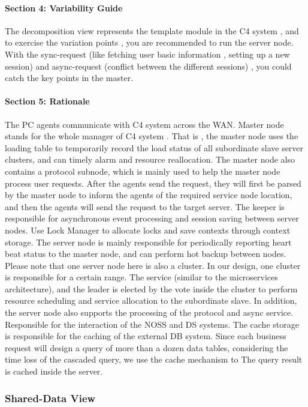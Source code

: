 \documentclass{article}
\begin{document}
			\paragraph{Section 4: Variability Guide}
			The decomposition view represents the template module in the C4 system , and to exercise the variation points , you are recommended to run the server node. With the sync-request (like fetching user basic information , setting up a new session)  and async-request (conflict between the different sessions) , you could catch the key points in the master.
			\paragraph{Section 5: Rationale}
			The PC agents communicate with C4 system across the WAN. 
			Master node stands for the whole manager of C4 system . That is ,  the master node uses the loading table to temporarily record the load status of all subordinate slave server clusters, and can timely alarm and resource reallocation. The master node also contains a protocol subnode, which is mainly used to help the master node process user requests. After the agents send the request, they will first be parsed by the master node to inform the agents of the required service node location, and then the agents will send the request to the target server.	
			The keeper is responsible for asynchronous event processing and session saving between server nodes. Use Lock Manager to allocate locks and save contexts through context storage.
			The server node is mainly responsible for periodically reporting heart beat status to the master node, and can perform hot backup between nodes. Please note that one server node here is also a cluster. In our design, one cluster is responsible for a certain range. The service (similar to the microservices architecture), and the leader is elected by the vote inside the cluster to perform resource scheduling and service allocation to the subordinate slave. In addition, the server node also supports the processing of the protocol and async service. Responsible for the interaction of the NOSS and DS systems. The cache storage is responsible for the caching of the external DB system. Since each business request will design a query of more than a dozen data tables, considering the time loss of the cascaded query, we use the cache mechanism to The query result is cached inside the server.

		\subsubsection{Shared-Data View} 
\end{document}
